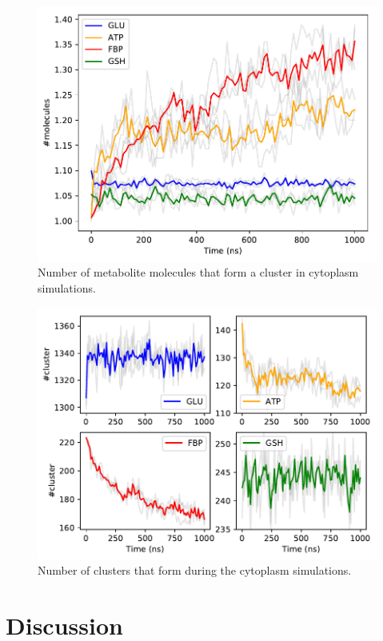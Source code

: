 \documentclass[journal=jacsat,manuscript=article]{achemso}
\begin{document}
\begin{figure}
\includegraphics[scale=0.6]{avclust.pdf}
\caption{Number of metabolite molecules that form a cluster in cytoplasm simulations.}
\end{figure}


\begin{figure}
\includegraphics[scale=0.6]{nclust.pdf}
\caption{Number of clusters that form during the cytoplasm simulations.}
\end{figure}









 
\section*{Discussion}\label{sec:dissc}
 




 

 
\end{document}
